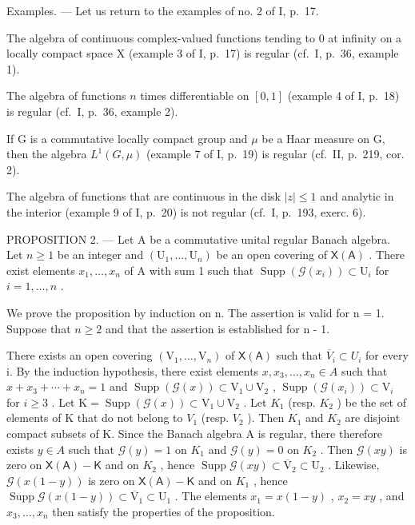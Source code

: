 Examples. --- Let us return to the examples of no. 2 of I, p.~17.

The algebra of continuous complex-valued functions tending to 0 at infinity on a locally compact space X (example 3 of I, p.~17) is regular (cf.~I, p.~36, example 1).

The algebra of functions \(n\) times differentiable on \([0, 1]\) (example 4 of I, p.~18) is regular (cf.~I, p.~36, example 2).

If G is a commutative locally compact group and \(\mu\) be a Haar measure on G, then the algebra \(L^{1}(G,\mu)\) (example 7 of I, p.~19) is regular (cf.~II, p.~219, cor. 2).

The algebra of functions that are continuous in the disk \(|z| \leqslant 1\) and analytic in the interior (example 9 of I, p.~20) is not regular (cf.~I, p.~193, exerc. 6).

PROPOSITION 2. --- Let A be a commutative unital regular Banach algebra. Let \(n \geqslant 1\) be an integer and \((\mathrm{U}_{1}, \ldots, \mathrm{U}_{n})\) be an open covering of \(\mathsf{X}(\mathsf{A})\) . There exist elements \(x_{1}, \ldots, x_{n}\) of A with sum 1 such that \(\operatorname{Supp}(\mathcal{G}(x_{i})) \subset \mathrm{U}_{i}\) for \(i = 1, \ldots, n\) .

We prove the proposition by induction on n. The assertion is valid for n = 1. Suppose that \(n \geqslant 2\) and that the assertion is established for n - 1.

There exists an open covering \((\mathrm{V}_{1},\ldots,\mathrm{V}_{n})\) of \(\mathsf{X}(\mathsf{A})\) such that \(\overline{V}_{i}\subset U_{i}\) for every i. By the induction hypothesis, there exist elements \(x,x_{3},\ldots,x_{n}\in A\) such that \(x+x_{3}+\cdots+x_{n}=1\) and \(\operatorname{Supp}(\mathcal{G}(x))\subset\mathrm{V}_{1}\cup\mathrm{V}_{2}\) , \(\operatorname{Supp}(\mathcal{G}(x_{i}))\subset\mathrm{V}_{i}\) for \(i\geqslant3\) . Let \(\mathrm{K}=\operatorname{Supp}(\mathcal{G}(x))\subset\mathrm{V}_{1}\cup\mathrm{V}_{2}\) . Let \(K_{1}\) (resp. \(K_{2}\) ) be the set of elements of K that do not belong to \(V_{1}\) (resp. \(V_{2}\) ). Then \(K_{1}\) and \(K_{2}\) are disjoint compact subsets of K. Since the Banach algebra A is regular, there therefore exists \(y\in A\) such that \(\mathcal{G}(y)=1\) on \(K_{1}\) and \(\mathcal{G}(y)=0\) on \(K_{2}\) . Then \(\mathcal{G}(xy)\) is zero on \(\mathsf{X}(\mathsf{A})-\mathsf{K}\) and on \(K_{2}\) , hence \(\operatorname{Supp}\mathcal{G}(xy)\subset\overline{\mathrm{V}}_{2}\subset\mathrm{U}_{2}\) . Likewise, \(\mathcal{G}(x(1-y))\) is zero on \(\mathsf{X}(\mathsf{A})-\mathsf{K}\) and on \(K_{1}\) , hence \(\operatorname{Supp}\mathcal{G}(x(1-y))\subset\overline{\mathrm{V}}_{1}\subset\mathrm{U}_{1}\) . The elements \(x_{1}=x(1-y)\) , \(x_{2}=xy\) , and \(x_{3},\ldots,x_{n}\) then satisfy the properties of the proposition.

